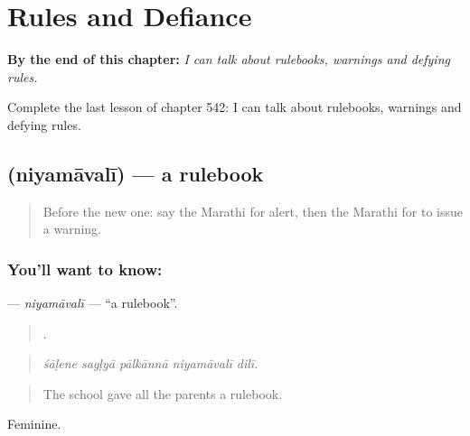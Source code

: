 
\chapter{Rules and Defiance}
\label{ch:mr-rules-and-defiance}

\begin{chapteropening}
\textbf{By the end of this chapter:} \emph{I can talk about rulebooks, warnings and defying rules.}

Complete the last lesson of chapter 542: I can talk about rulebooks, warnings and defying rules.
\end{chapteropening}

\section[\texorpdfstring{\mr{नियमावली} (niyamāvalī)}{नियमावली (niyamāvalī)}]{ (niyamāvalī) — a rulebook}

\label{lesson:MR-C542-niyamavali}



\begin{quote}
Before the new one: say the Marathi for alert, then the Marathi for to issue a warning.
\end{quote}

\subsection*{You'll want to know: }
\textbf{} — \emph{niyamāvalī} — \textquotedblleft{}a rulebook\textquotedblright{}.

\begin{quote}
    .
\end{quote}

\begin{quote}
\emph{śāḷene sagḷyā pālkānnā niyamāvalī dilī.}
\end{quote}

\begin{quote}
The school gave all the parents a rulebook.
\end{quote}

Feminine.

